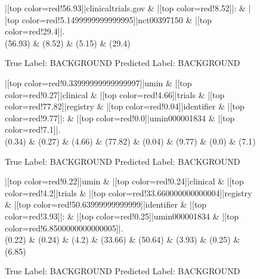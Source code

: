 \documentclass[a4paper, landscape]{article}
\begin{document}
\clearpage
\begin{figure}
\begin{center}
\begin{dependency}
\begin{deptext}
|[top color=red!56.93]|clinicaltrials.gov \& |[top color=red!8.52]|: \& |[top color=red!5.1499999999999995]|nct00397150 \& |[top color=red!29.4]|.\\
(56.93) \& (8.52) \& (5.15) \& (29.4)\\
\end{deptext}
\end{dependency}
\end{center}
\caption{True Label: BACKGROUND Predicted Label: BACKGROUND}
\end{figure}
\clearpage
\begin{figure}
\begin{center}
\begin{dependency}
\begin{deptext}
|[top color=red!0.33999999999999997]|umin \& |[top color=red!0.27]|clinical \& |[top color=red!4.66]|trials \& |[top color=red!77.82]|registry \& |[top color=red!0.04]|identifier \& |[top color=red!9.77]|: \& |[top color=red!0.0]|umin000001834 \& |[top color=red!7.1]|.\\
(0.34) \& (0.27) \& (4.66) \& (77.82) \& (0.04) \& (9.77) \& (0.0) \& (7.1)\\
\end{deptext}
\end{dependency}
\end{center}
\caption{True Label: BACKGROUND Predicted Label: BACKGROUND}
\end{figure}
\clearpage
\begin{figure}
\begin{center}
\begin{dependency}
\begin{deptext}
|[top color=red!0.22]|umin \& |[top color=red!0.24]|clinical \& |[top color=red!4.2]|trials \& |[top color=red!33.660000000000004]|registry \& |[top color=red!50.63999999999999]|identifier \& |[top color=red!3.93]|: \& |[top color=red!0.25]|umin000001834 \& |[top color=red!6.8500000000000005]|.\\
(0.22) \& (0.24) \& (4.2) \& (33.66) \& (50.64) \& (3.93) \& (0.25) \& (6.85)\\
\end{deptext}
\end{dependency}
\end{center}
\caption{True Label: BACKGROUND Predicted Label: BACKGROUND}
\end{figure}
\end{document}
